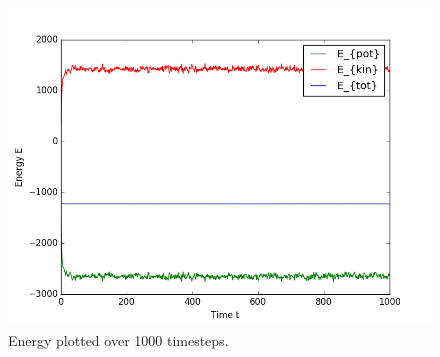 \begin{figure}[h]
\includegraphics[width=0.7\linewidth]{fig/Energies.png}
  \centering
  \caption{Energy plotted over 1000 timesteps.}
\label{fig:energy}
\end{figure}

